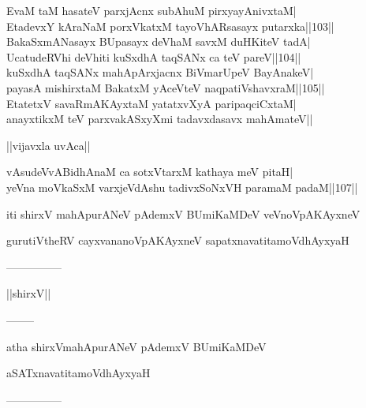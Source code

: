 \documentclass{article}
\begin{document}
EvaM taM hasateV parxjAcnx subAhuM pirxyayAnivxtaM|\\
EtadevxY kAraNaM porxVkatxM tayoVhARsasayx putarxka||103||\\
BakaSxmANasayx BUpasayx deVhaM savxM duHKiteV tadA|\\
UcatudeRVhi deVhiti kuSxdhA taqSANx ca teV pareV||104||\\
kuSxdhA taqSANx mahApArxjacnx BiVmarUpeV BayAnakeV|\\
payasA mishirxtaM BakatxM yAceVteV naqpatiVshavxraM||105||\\
EtatetxV savaRmAKAyxtaM yatatxvXyA paripaqciCxtaM|\\
anayxtikxM teV parxvakASxyXmi tadavxdasavx mahAmateV||\\

\begin{center}
||vijavxla uvAca||
\end{center}

vAsudeVvABidhAnaM ca sotxVtarxM kathaya meV pitaH|\\
yeVna moVkaSxM varxjeVdAshu tadivxSoNxVH paramaM padaM||107||\\

\begin{center}
iti shirxV mahApurANeV pAdemxV BUmiKaMDeV veVnoVpAKAyxneV
\end{center}

\begin{center}
gurutiVtheRV cayxvananoVpAKAyxneV sapatxnavatitamoVdhAyxyaH
\end{center}

\begin{center}
---------------
\end{center}

\begin{center}
||shirxV||
\end{center}

\begin{center}
--------
\end{center}

\begin{center}
atha shirxVmahApurANeV pAdemxV BUmiKaMDeV
\end{center}

\begin{center}
aSATxnavatitamoVdhAyxyaH
\end{center}

\begin{center}
---------------
\end{center}
\end{document}
